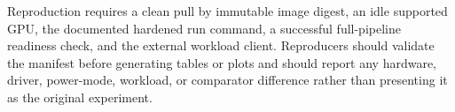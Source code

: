 Reproduction requires a clean pull by immutable image digest, an idle supported
GPU, the documented hardened run command, a successful full-pipeline readiness
check, and the external workload client. Reproducers should validate the
manifest before generating tables or plots and should report any hardware,
driver, power-mode, workload, or comparator difference rather than presenting
it as the original experiment.
